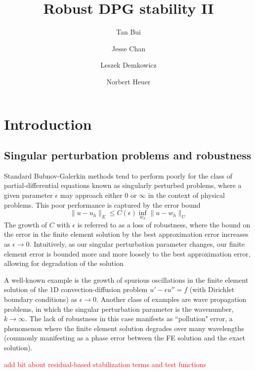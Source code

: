 \documentclass[11pt,onecolumn]{scrartcl}
\author{Tan Bui \and Jesse Chan \and Leszek Demkowicz \and Norbert Heuer}
\title{Robust DPG stability II}
\date{}
\begin{document}
\tableofcontents
\maketitle

\section{Introduction}

\subsection{Singular perturbation problems and robustness}

Standard Bubnov-Galerkin methods tend to perform poorly for the class of partial-differential equations known as singularly perturbed problems, where a given parameter $\epsilon$ may approach either $0$ or $\infty$ in the context of physical problems.  This poor performance is captured by the error bound
\[
\|u-u_h\|_E \leq C(\epsilon) \inf_{w_h}\|u-w_h\|_U
\]
The growth of $C$ with $\epsilon$ is referred to as a loss of robustness, where the bound on the error in the finite element solution by the best approximation error increases as $\epsilon\rightarrow 0$.  Intuitively, as our singular perturbation parameter changes, our finite element error is bounded more and more loosely to the best approximation error, allowing for degradation of the solution   

A well-known example is the growth of spurious oscillations in the finite element solution of the 1D convection-diffusion problem $ u'-\epsilon u'' = f$ (with Dirichlet boundary conditions) as $\epsilon\rightarrow 0$.  Another class of examples are wave propagation problems, in which the singular perturbation parameter is the wavenumber, $k\rightarrow \infty$.  The lack of robustness in this case manifests as ``pollution" error, a phenomenon where the finite element solution degrades over many wavelengths (commonly manifesting as a phase error between the FE solution and the exact solution).  

\textcolor{red}{add bit about residual-based stabilization terms and test functions}
\end{document}
